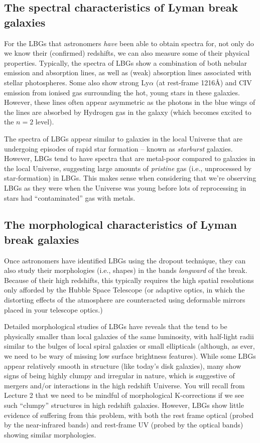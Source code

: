 \documentclass[11pt]{article}
\begin{document}
\subsection{The spectral characteristics of Lyman break galaxies}
For the LBGs that astronomers {\it have} been able to obtain spectra
for, not only do we know their (confirmed) redshifts, we can also
measure some of their physical properties. Typically, the spectra of
LBGs show a combination of both nebular emission and absorption lines,
as well as (weak) absorption lines associated with stellar
photospheres. Some also show strong Ly$\alpha$ (at rest-frame 1216\AA )
and C{\sc IV} emission from ionised gas surrounding the hot, young
stars in these galaxies. However, these lines often appear asymmetric
as the photons in the blue wings of the lines are absorbed by Hydrogen
gas in the galaxy (which becomes excited to the $n=2$ level).

The spectra of LBGs appear similar to galaxies in the local Universe
that are undergoing episodes of rapid star formation -- known as {\it
  starburst} galaxies. However, LBGs tend to have spectra that are
metal-poor compared to galaxies in the local Universe, suggesting
large amounts of {\it pristine} gas (i.e., unprocessed by
star-formation) in LBGs. This makes sense when considering that we're
observing LBGs as they were when the Universe was young before lots of
reprocessing in stars had ``contaminated'' gas with metals.

\subsection{The morphological characteristics of Lyman break galaxies}
Once astronomers have identified LBGs using the dropout technique,
they can also study their morphologies (i.e., shapes) in the bands
{\it longward} of the break. Because of their high redshifts, this
typically requires the high spatial resolutions only afforded by the
Hubble Space Telescope (or adaptive optics, in which the distorting
effects of the atmosphere are counteracted using deformable mirrors
placed in your telescope optics.)

Detailed morphological studies of LBGs have reveals that the tend to
be physically smaller than local galaxies of the same luminosity, with
half-light radii similar to the bulges of local spiral galaxies or
small ellipticals (although, as ever, we need to be wary of missing
low surface brightness features). While some LBGs appear relatively
smooth in structure (like today's disk galaxies), many show signs of
being highly clumpy and irregular in nature, which is suggestive of
mergers and/or interactions in the high redshift Universe. You will
recall from Lecture 2 that we need to be mindful of morphological
K-corrections if we see such ``clumpy'' structures in high redshift
galaxies. However, LBGs show little evidence of suffering from this
problem, with both the rest frame optical (probed by the near-infrared
bands) and rest-frame UV (probed by the optical bands) showing similar
morphologies.
\end{document}
